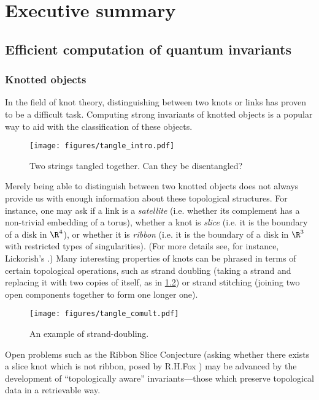 \chapter{Executive summary}
\label{ch:summary}

\section{Efficient computation of quantum invariants}
\subsection{Knotted objects}
In the field of knot theory, distinguishing between two knots or links
has proven to be a difficult task. Computing strong invariants of knotted
objects is a popular way to aid with the classification of these objects.
\begin{figure}[h]
        \centering
        \texttt{[image: figures/tangle\_intro.pdf]}
        \caption{Two strings tangled together. Can they be disentangled?}
        \label{fig:unknot}
\end{figure}

Merely being able to distinguish between two knotted objects does not always
provide us with enough information about these topological structures. For
instance, one may ask if a link is a \emph{satellite} (i.e. whether its
complement has a non-trivial embedding of a torus), whether a knot is
\emph{slice} (i.e. it is the boundary of a disk in $\R^4$), or whether it is
\emph{ribbon} (i.e. it is the boundary of a disk in $\R^3$ with restricted types
of singularities). (For more details see, for instance, Lickorish's
\cite{lickorish}.) Many interesting properties of knots can be phrased in terms
of certain topological operations, such as strand doubling (taking a strand and
replacing it with two copies of itself, as in \cref{fig:strand_double}) or
strand stitching (joining two open components together to form one longer one).

\begin{figure}[h]
        \centering
        \texttt{[image: figures/tangle\_comult.pdf]}
        \caption{An example of strand-doubling.}
        \label{fig:strand_double}
\end{figure}

Open problems such as the Ribbon Slice Conjecture (asking whether there exists a
slice knot which is not ribbon, posed by R.\@ H.\@ Fox \cite{fox}) may be
advanced by the development of \enquote{topologically aware} invariants---those
which preserve topological data in a retrievable way.

